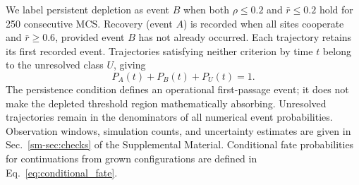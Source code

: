 We label persistent depletion as event $B$ when both $\rho\le0.2$ and $\bar r\le0.2$ hold for 250 consecutive MCS. Recovery (event $A$) is recorded when all sites cooperate and $\bar r\ge0.6$, provided event $B$ has not already occurred. Each trajectory retains its first recorded event. Trajectories satisfying neither criterion by time $t$ belong to the unresolved class $U$, giving
\begin{equation}
\label{eq:partition}
P_A(t)+P_B(t)+P_U(t)=1.
\end{equation}
The persistence condition defines an operational first-passage event; it does not make the depleted threshold region mathematically absorbing. Unresolved trajectories remain in the denominators of all numerical event probabilities. Observation windows, simulation counts, and uncertainty estimates are given in Sec.~\ref{sm-sec:checks} of the Supplemental Material. Conditional fate probabilities for continuations from grown configurations are defined in Eq.~\eqref{eq:conditional_fate}.

